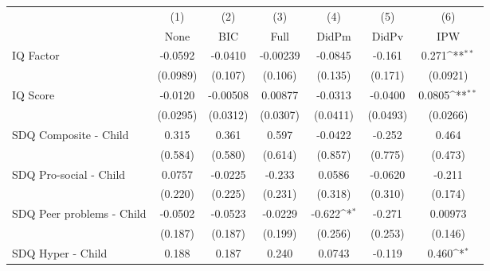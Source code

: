 {
\def\sym#1{\ifmmode^{#1}\else\(^{#1}\)\fi}
\begin{tabular}{l*{6}{c}}
\toprule
            &\multicolumn{1}{c}{(1)}&\multicolumn{1}{c}{(2)}&\multicolumn{1}{c}{(3)}&\multicolumn{1}{c}{(4)}&\multicolumn{1}{c}{(5)}&\multicolumn{1}{c}{(6)}\\
            &\multicolumn{1}{c}{None}&\multicolumn{1}{c}{BIC}&\multicolumn{1}{c}{Full}&\multicolumn{1}{c}{DidPm}&\multicolumn{1}{c}{DidPv}&\multicolumn{1}{c}{IPW}\\
\midrule
IQ Factor   &     -0.0592         &     -0.0410         &    -0.00239         &     -0.0845         &      -0.161         &       0.271\sym{**} \\
            &    (0.0989)         &     (0.107)         &     (0.106)         &     (0.135)         &     (0.171)         &    (0.0921)         \\
\addlinespace
IQ Score    &     -0.0120         &    -0.00508         &     0.00877         &     -0.0313         &     -0.0400         &      0.0805\sym{**} \\
            &    (0.0295)         &    (0.0312)         &    (0.0307)         &    (0.0411)         &    (0.0493)         &    (0.0266)         \\
\addlinespace
SDQ Composite - Child&       0.315         &       0.361         &       0.597         &     -0.0422         &      -0.252         &       0.464         \\
            &     (0.584)         &     (0.580)         &     (0.614)         &     (0.857)         &     (0.775)         &     (0.473)         \\
\addlinespace
SDQ Pro-social - Child&      0.0757         &     -0.0225         &      -0.233         &      0.0586         &     -0.0620         &      -0.211         \\
            &     (0.220)         &     (0.225)         &     (0.231)         &     (0.318)         &     (0.310)         &     (0.174)         \\
\addlinespace
SDQ Peer problems - Child&     -0.0502         &     -0.0523         &     -0.0229         &      -0.622\sym{*}  &      -0.271         &     0.00973         \\
            &     (0.187)         &     (0.187)         &     (0.199)         &     (0.256)         &     (0.253)         &     (0.146)         \\
\addlinespace
SDQ Hyper - Child&       0.188         &       0.187         &       0.240         &      0.0743         &      -0.119         &       0.460\sym{*}  \\

\end{tabular}}
